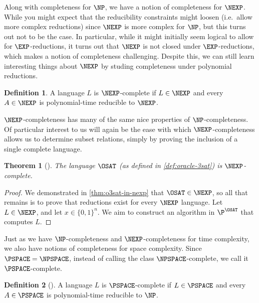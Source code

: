 \documentclass[english]{reedthesis}
\theoremstyle{plain}
\newtheorem{thm}{Theorem}[section]
\theoremstyle{definition}
\newtheorem{defn}[defn]{Definition}
\theoremstyle{remark}
\begin{document}
Along with completeness for $\NP$, we have a notion of completeness for $\NEXP$.
While you might expect that the reducibility constraints might loosen (i.e.\
allow more complex reductions) since $\NEXP$ is more complex for $\NP$, but this
turns out not to be the case. In particular, while it might initially seem
logical to allow for $\EXP$-reductions, it turns out that $\NEXP$ is not closed
under $\EXP$-reductions, which makes a notion of completeness challenging.
Despite this, we can still learn interesting things about $\NEXP$ by studing
completeness under polynomial reductions.

\begin{defn}\label{def:nexp-complete}
  A language $L$ is $\NEXP$-complete if $L \in \NEXP$ and every $A \in \NEXP$ is
  polynomial-time reducible to $\NEXP$.
\end{defn}

$\NEXP$-completeness has many of the same nice properties of $\NP$-completeness.
Of particular interest to us will again be the ease with which
$\NEXP$-completeness allows us to determine subset relations, simply by proving
the inclusion of a single complete language.

\begin{thm}[{\cite[Proposition 4.2]{BFL90}}]\label{thm:o3sat-nexp-complete}
  The language $\OSAT$ (as defined in \cref{def:oracle-3sat}) is
  $\NEXP$-complete.
\end{thm}

\begin{proof}
  We demonstrated in \cref{thm:o3sat-in-nexp} that $\OSAT \in \NEXP$, so all that
  remains is to prove that reductions exist for every $\NEXP$ language. Let
  $L \in \NEXP$, and let $x \in \{0, 1\}^{n}$. We aim to construct an algorithm in
  $\P^{\OSAT}$ that computes $L$.
\end{proof}

Just as we have $\NP$-completeness and $\NEXP$-completeness for time complexity,
we also have notions of completeness for space complexity. Since
$\PSPACE = \NPSPACE$, instead of calling the class $\NPSPACE$-complete, we call
it $\PSPACE$-complete.

\begin{defn}[{\cite[Def.\ 8.8]{Sip97}}]\label{def:pspace-complete}
  A language $L$ is $\PSPACE$-complete if $L \in \PSPACE$ and every $A \in \PSPACE$
  is polynomial-time reducible to $\NP$.
\end{defn}
\end{document}
